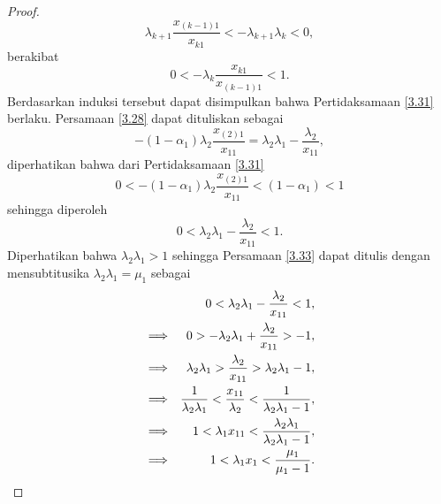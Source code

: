 \begin{proof}
\begin{equation*}
        \lambda_{k+1}\frac{x_{(k-1)1}}{x_{k1}} < -\lambda_{k+1}\lambda_{k} < 0,
    \end{equation*}
    berakibat
    \begin{equation*}
        0 < -\lambda_{k}\frac{x_{k1}}{x_{(k-1)1}} < 1.
    \end{equation*}
    Berdasarkan induksi tersebut dapat disimpulkan bahwa Pertidaksamaan \eqref{3.31} berlaku. Persamaan \eqref{3.28} dapat dituliskan sebagai
    \begin{equation*}
        -(1 - \alpha_1) \lambda_{2} \frac{x_{(2)1}}{x_{11}} = \lambda_{2}\lambda_{1} - \frac{\lambda_{2}}{x_{11}},
    \end{equation*}
    diperhatikan bahwa dari Pertidaksamaan \eqref{3.31}
    \begin{equation*}
        0 < -(1 - \alpha_1) \lambda_{2} \frac{x_{(2)1}}{x_{11}} < (1 - \alpha_1) < 1
    \end{equation*}
    sehingga diperoleh
    \begin{equation}\label{3.33}
        0 <  \lambda_{2}\lambda_{1} - \frac{\lambda_{2}}{x_{11}} < 1.
    \end{equation}
    Diperhatikan bahwa $\lambda_{2}\lambda_{1} > 1$ sehingga Persamaan \eqref{3.33} dapat ditulis dengan mensubtitusika $\lambda_{2}\lambda_{1}=\mu_1$ sebagai
    \begin{align}
        &&0 <  \lambda_{2}\lambda_{1} - \frac{\lambda_{2}}{x_{11}} < 1, \notag \\
        &\Longrightarrow&0 >  -\lambda_{2}\lambda_{1} + \frac{\lambda_{2}}{x_{11}} > -1,\notag \\
        &\Longrightarrow&\lambda_{2}\lambda_{1} > \frac{\lambda_{2}}{x_{11}} > \lambda_{2}\lambda_{1} - 1,\notag \\
        &\Longrightarrow& \frac{1}{\lambda_{2}\lambda_{1}} < \frac{x_{11}}{\lambda_{2}} < \frac{1}{\lambda_{2}\lambda_{1} - 1},\notag \\
        &\Longrightarrow&1 < \lambda_{1}x_{11} < \frac{\lambda_{2}\lambda_{1}}{\lambda_{2}\lambda_{1} - 1}, \notag \\
        &\Longrightarrow& 1 < \lambda_{1}x_{1} <  \frac{\mu_1}{\mu_1 - 1}. \label{3.34}
    \end{align}
    

\end{proof}
